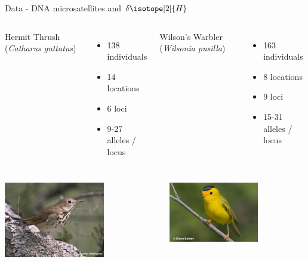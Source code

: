 \documentclass[11pt,ignorenonframetext,]{beamer}
\begin{document}
\begin{frame}{Data - DNA microsatellites and \(\delta \isotope[2]{H}\)}
\protect\hypertarget{data---dna-microsatellites-and-delta-isotope2h}{}

\begin{columns}[t]
Hermit Thrush (\textit{Catharus guttatus}) \\
\vspace{2mm}
\begin{itemize}
\item 138 individuals
\item 14 locations
\item 6 loci
\item 9-27 alleles / locus
\end{itemize}
Wilson's Warbler (\textit{Wilsonia pusilla}) \\
\vspace{2mm}
\begin{itemize}
\item 163 individuals
\item 8 locations
\item 9 loci
\item 15-31 alleles / locus
\end{itemize}

\end{columns}

\vspace{5mm}

\begin{columns}[t]
\begin{center}
\includegraphics[width=0.65\textwidth]{figs/hermit_thrush.jpeg}
\end{center}
\begin{center}
\includegraphics[width=0.65\textwidth]{figs/wilsons_warbler.jpeg}
\end{center}
\end{columns}

\end{frame}
\end{document}
